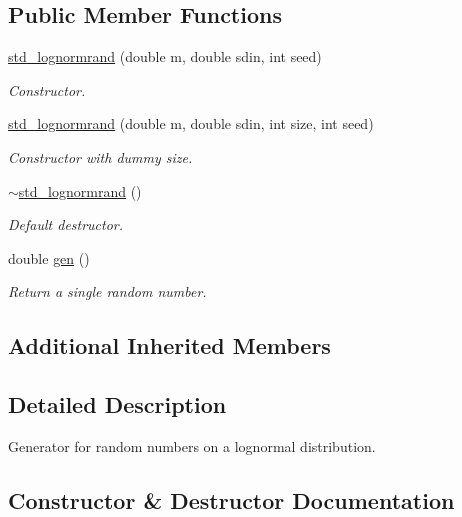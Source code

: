 \subsection*{Public Member Functions}
\begin{DoxyCompactItemize}
\item 
\hyperlink{classstdrand_1_1std__lognormrand_a4d27599458dc5b075d723a445431d2f7}{std\+\_\+lognormrand} (double m, double sdin, int seed)
\begin{DoxyCompactList}\small\item\em Constructor. \end{DoxyCompactList}\item 
\hyperlink{classstdrand_1_1std__lognormrand_a21729248c87a39d6522a405a85b6a808}{std\+\_\+lognormrand} (double m, double sdin, int size, int seed)
\begin{DoxyCompactList}\small\item\em Constructor with dummy size. \end{DoxyCompactList}\item 
\hyperlink{classstdrand_1_1std__lognormrand_af73b651b8fde69e3535660eca7fac95f}{$\sim$std\+\_\+lognormrand} ()
\begin{DoxyCompactList}\small\item\em Default destructor. \end{DoxyCompactList}\item 
double \hyperlink{classstdrand_1_1std__lognormrand_a4521bea46b321ea53a2026eac8dc046a}{gen} ()
\begin{DoxyCompactList}\small\item\em Return a single random number. \end{DoxyCompactList}\end{DoxyCompactItemize}
\subsection*{Additional Inherited Members}


\subsection{Detailed Description}
Generator for random numbers on a lognormal distribution. 

\subsection{Constructor \& Destructor Documentation}
